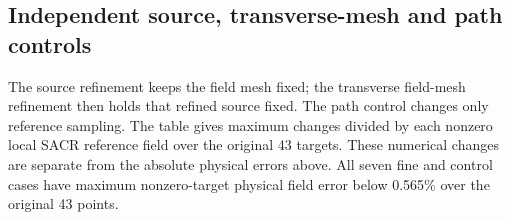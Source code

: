 \subsection{Independent source, transverse-mesh and path controls}
The source refinement keeps the field mesh fixed; the transverse field-mesh
refinement then holds that refined source fixed. The path control changes
only reference sampling. The table gives maximum changes divided by each
nonzero local SACR reference field over the original 43 targets.
These numerical changes are separate from the absolute physical errors above.
All seven fine and control cases have maximum nonzero-target physical field
error below 0.565\% over the original 43 points.

